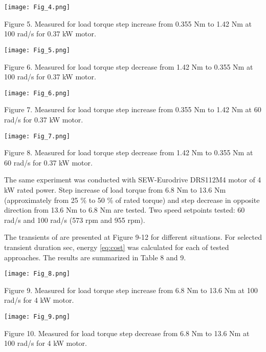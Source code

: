 \documentclass[journal]{IEEEtran}
\begin{document}
\begin{center}
\ifpdf \texttt{[image: Fig\_4.png]}
\fi

Figure 5. Measured  for load torque step increase from 0.355 Nm to 1.42 Nm at 100 rad/s for 0.37 kW motor.
\end{center}

\begin{center}
\ifpdf \texttt{[image: Fig\_5.png]}
\fi

Figure 6. Measured  for load torque step decrease from 1.42 Nm to 0.355 Nm at 100 rad/s for 0.37 kW motor.
\end{center}

\begin{center}
\ifpdf \texttt{[image: Fig\_6.png]}
\fi

Figure 7. Measured  for load torque step increase from 0.355 Nm to 1.42 Nm at 60 rad/s for 0.37 kW motor.
\end{center}

\begin{center}
\ifpdf \texttt{[image: Fig\_7.png]}
\fi

Figure 8. Measured  for load torque step decrease from 1.42 Nm to 0.355 Nm at 60 rad/s for 0.37 kW motor.
\end{center}

The same experiment was conducted with SEW-Eurodrive DRS112M4 motor of 4 kW rated power. Step increase of load torque from 6.8 Nm to 13.6 Nm (approximately from 25 \% to 50 \% of rated torque) and step decrease in opposite direction from 13.6 Nm to 6.8 Nm are tested. Two speed setpoints tested: 60 rad/s and 100 rad/s (573 rpm and 955 rpm).

The transients of  are presented at Figure 9-12 for different situations. For selected transient duration  sec, energy  \eqref{eq:cost} was calculated for each of tested approaches. The results are summarized in Table 8 and 9.

\begin{center}
\ifpdf \texttt{[image: Fig\_8.png]}
\fi

Figure 9. Measured  for load torque step increase from 6.8 Nm to 13.6 Nm at 100 rad/s for 4 kW motor.
\end{center}

\begin{center}
\ifpdf \texttt{[image: Fig\_9.png]}
\fi

Figure 10. Measured  for load torque step decrease from 6.8 Nm to 13.6 Nm at 100 rad/s for 4 kW motor.
\end{center}
\end{document}
